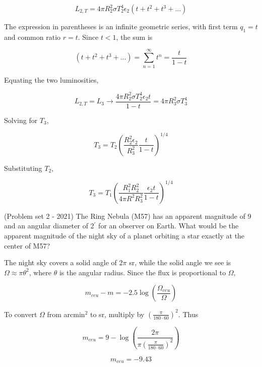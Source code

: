 \documentclass[11pt]{article}
\begin{document}
\begin{pproblem}
\begin{pssolution*}{}{}
\begin{alternativas}
         \[L_{2,T} = 4\pi R_2^2\sigma T_2^4\epsilon_2 (t+t^2+t^3+...)\]

         The expression in parentheses is an infinite geometric series, with first term \(q_1 = t\) and common ratio \(r = t\). Since \(t<1\), the sum is

         \[(t+t^2+t^3+...) = \sum_{n=1}^{\infty}t^n = \frac{t}{1-t}\]

         Equating the two luminosities,

         \[L_{2,T} = L_3 \rightarrow \frac{4\pi R_2^2\sigma T_2^4 \epsilon_2 t}{1-t} = 4\pi R_3^2\sigma T_3^4\]

         Solving for \(T_3\),

         \[T_3 = T_2\left(\frac{R_2^2\epsilon_2}{R_3^2}\frac{t}{1-t}\right)^{1/4}\]

         Substituting \(T_2\),

         \[\boxed{T_3 =T_1\left(\frac{R_1^2R_2^2}{4\pi R^2R_3^2}\frac{\epsilon_2t}{1-t}\right)^{1/4}}\]


    \end{alternativas}
    
\end{pssolution*}
\end{pproblem}


\begin{pproblem}(Problem set 2 - 2021)
    The Ring Nebula (M57) has an apparent magnitude of 9 and an
angular diameter of 2$^{\prime}$ for an observer on Earth. What would be the apparent magnitude of the night
sky of a planet orbiting a star exactly at the center of M57?
\begin{pssolution*}{}{}
    The night sky covers a solid angle of \(2\pi\) sr, while the solid angle we see is \(\Omega \approx \pi \theta^2\), where \(\theta\) is the angular radius. Since the flux is proportional to \(\Omega\),

    \[m_{ceu}-m = -2.5\log\left(\frac{\Omega_{ceu}}{\Omega}\right)\]

    To convert \(\Omega\) from arcmin\(^2\) to sr, multiply by \(\left(\frac{\pi}{180\cdot60}\right)^2\). Thus
    
    \[m_{ceu} = 9 - \log\left(\frac{2\pi}{\pi(\frac{\pi}{180\cdot60})^2}\right)\]

    \[\boxed{m_{ceu} = -9.43}\]
\end{pssolution*}
\end{pproblem}
\end{document}
